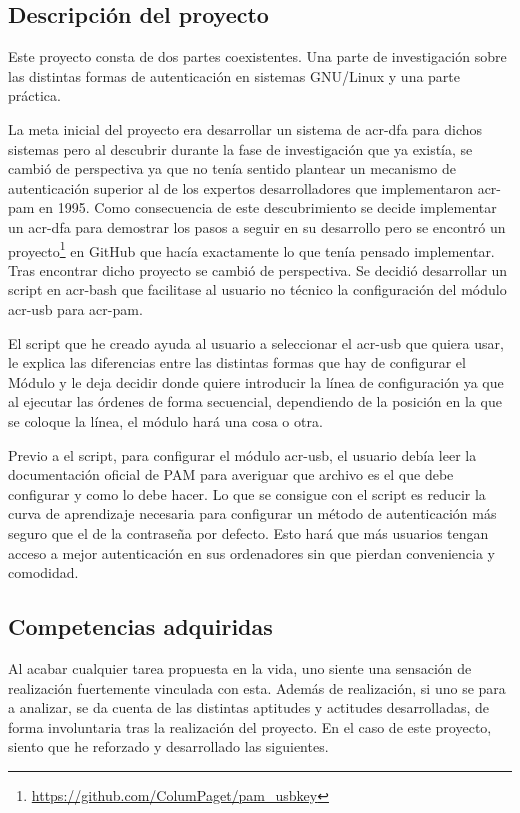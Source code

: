 \documentclass[twoside, titlepage, 12pt, a4paper]{article}
\begin{document}
\subsection{Descripción del proyecto}
Este proyecto consta de dos partes coexistentes. Una parte de investigación sobre las distintas formas de autenticación en sistemas \gls{GNU/Linux} y una parte práctica.\par
La meta inicial del proyecto era desarrollar un sistema de \gls{acr-dfa} para dichos sistemas pero al descubrir durante la fase de investigación que ya existía, se cambió de perspectiva ya que no tenía sentido plantear un mecanismo de autenticación superior al de los expertos desarrolladores que implementaron \gls{acr-pam} en 1995. Como consecuencia de este descubrimiento se decide implementar un \gls{acr-dfa} para demostrar los pasos a seguir en su desarrollo pero se encontró un proyecto\footnote{\url{https://github.com/ColumPaget/pam_usbkey}} en \gls{GitHub} que hacía exactamente lo que tenía pensado implementar. Tras encontrar dicho proyecto se cambió de perspectiva. Se decidió desarrollar un \gls{script} en \gls{acr-bash} que facilitase al usuario no técnico la configuración del módulo \gls{acr-usb} para \gls{acr-pam}.\par
El \gls{script} que he creado ayuda al usuario a seleccionar el \gls{acr-usb} que quiera usar, le explica las diferencias entre las distintas formas que hay de configurar el Módulo y le deja decidir donde quiere introducir la línea de configuración ya que al ejecutar las órdenes de forma secuencial, dependiendo de la posición en la que se coloque la línea, el módulo hará una cosa o otra. \par
Previo a el \gls{script}, para configurar el módulo \gls{acr-usb}, el usuario debía leer la documentación oficial de PAM para averiguar que archivo es el que debe configurar y como lo debe hacer. Lo que se consigue con el \gls{script} es reducir la curva de aprendizaje necesaria para configurar un método de autenticación más seguro que el de la contraseña por defecto. Esto hará que más usuarios tengan acceso a mejor autenticación en sus ordenadores sin que pierdan conveniencia y comodidad.
\subsection{Competencias adquiridas}
Al acabar cualquier tarea propuesta en la vida, uno siente una sensación de realización fuertemente vinculada con esta. Además de realización, si uno se para a analizar, se da cuenta de las distintas aptitudes y actitudes desarrolladas, de forma involuntaria tras la realización del proyecto. En el caso de este proyecto, siento que he reforzado y desarrollado las siguientes.
\end{document}
